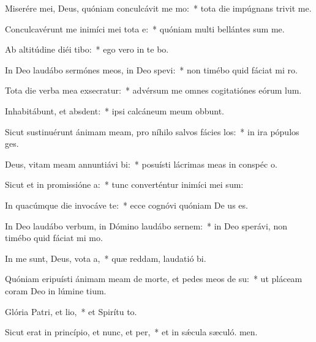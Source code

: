 \item Miserére mei, Deus, quóniam conculcávit me mo:~* tota die impúgnans trivit me.
\item Conculcavérunt me inimíci mei tota e:~* quóniam multi bellántes sum me.
\item Ab altitúdine diéi tibo:~* ego vero in te bo.
\item In Deo laudábo sermónes meos, in Deo spevi:~* non timébo quid fáciat mi ro.
\item Tota die verba mea exsecratur:~* advérsum me omnes cogitatiónes eórum  lum.
\item Inhabitábunt, et absdent:~* ipsi calcáneum meum obbunt.
\item Sicut sustinuérunt ánimam meam, pro níhilo salvos fácies los:~* in ira pópulos ges.
\item Deus, vitam meam annuntiávi bi:~* posuísti lácrimas meas in conspéc o.
\item Sicut et in promissióne a:~* tunc converténtur inimíci mei sum:
\item In quacúmque die invocáve te:~* ecce cognóvi quóniam De us es.
\item In Deo laudábo verbum, in Dómino laudábo sernem:~* in Deo sperávi, non timébo quid fáciat mi mo.
\item In me sunt, Deus, vota a,~* quæ reddam, laudatió bi.
\item Quóniam eripuísti ánimam meam de morte, et pedes meos de su:~* ut pláceam coram Deo in lúmine tium.
\item Glória Patri, et lio,~* et Spirítu to.
\item Sicut erat in princípio, et nunc, et per,~* et in sǽcula sæculó. men.
